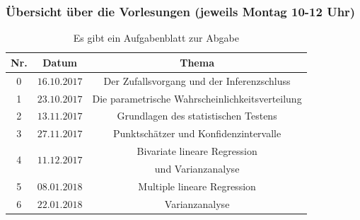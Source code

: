 \documentclass[usenames,dvipsnames,handout]{beamer}
\begin{document}
 \begin{frame}
 \frametitle{Übersicht über die Vorlesungen (jeweils Montag 10-12 Uhr)}%
    \begin{table}
\begin{center}
\caption{\colorbox{yellow!40}{Es gibt ein Aufgabenblatt zur Abgabe}}
  \begin{tabular}{|c|c|c|}
    \hline
    Nr. & Datum & Thema \\ \hline
    0 &   $ 16.10.2017$   &  \colorbox{blue!10}{  Der Zufallsvorgang und der Inferenzschluss}   \\ \hline
    \colorbox{yellow!40}{1} &  $23.10.2017$  &   \colorbox{blue!10}{Die parametrische  Wahrscheinlichkeitsverteilung } \\ \hline
    \colorbox{yellow!40}{2} &   $13.11.2017$   &   \colorbox{green!40}{Grundlagen des statistischen Testens}\\ \hline
    \colorbox{yellow!40}{3} &   $27.11.2017$   &   \colorbox{green!40}{Punktschätzer und Konfidenzintervalle }\\ \hline
  \multirow{2}{*}{\colorbox{yellow!40}{4}} &  \multirow{2}{*}{$11.12.2017$}& \colorbox{violet!40}{Bivariate lineare Regression} \\
                   &        & \colorbox{violet!40}{und Varianzanalyse}\\ \hline  
    \colorbox{yellow!40}{5} & $08.01.2018$      &  \colorbox{violet!40}{Multiple lineare Regression}  \\ \hline   
    6 &   $22.01.2018$     &  \colorbox{violet!40}{Varianzanalyse} \\ \hline
  \end{tabular}
  \end{center}
  \label{tab:multicol}
  \end{table}
\end{frame}
\end{document}
